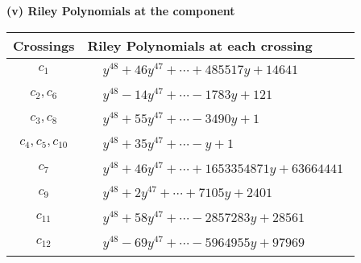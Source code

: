 \documentclass[1p]{elsarticle_modified}
\theoremstyle{definition}
\begin{document}
\newpage\renewcommand{\arraystretch}{1}
\flushleft \textbf{(v) Riley Polynomials at the component}\newline \\
\begin{tabular}{m{50pt}|m{274pt}}
Crossings & \hspace{64pt}Riley Polynomials at each crossing \\
\hline $$\begin{aligned}c_{1}\end{aligned}$$&$\begin{aligned}
&y^{48}+46 y^{47}+\cdots+485517 y+14641
\end{aligned}$\\
\hline $$\begin{aligned}c_{2},c_{6}\end{aligned}$$&$\begin{aligned}
&y^{48}-14 y^{47}+\cdots-1783 y+121
\end{aligned}$\\
\hline $$\begin{aligned}c_{3},c_{8}\end{aligned}$$&$\begin{aligned}
&y^{48}+55 y^{47}+\cdots-3490 y+1
\end{aligned}$\\
\hline $$\begin{aligned}c_{4},c_{5},c_{10}\end{aligned}$$&$\begin{aligned}
&y^{48}+35 y^{47}+\cdots- y+1
\end{aligned}$\\
\hline $$\begin{aligned}c_{7}\end{aligned}$$&$\begin{aligned}
&y^{48}+46 y^{47}+\cdots+1653354871 y+63664441
\end{aligned}$\\
\hline $$\begin{aligned}c_{9}\end{aligned}$$&$\begin{aligned}
&y^{48}+2 y^{47}+\cdots+7105 y+2401
\end{aligned}$\\
\hline $$\begin{aligned}c_{11}\end{aligned}$$&$\begin{aligned}
&y^{48}+58 y^{47}+\cdots-2857283 y+28561
\end{aligned}$\\
\hline $$\begin{aligned}c_{12}\end{aligned}$$&$\begin{aligned}
&y^{48}-69 y^{47}+\cdots-5964955 y+97969
\end{aligned}$\\
\hline
\end{tabular}\\~\\
\end{document}
